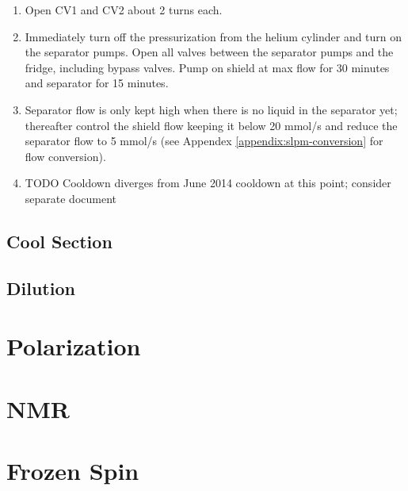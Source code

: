  \begin{enumerate}
 \item Open CV1 and CV2 about 2 turns each.
 \item Immediately turn off the pressurization from the helium cylinder and turn on the separator pumps.  Open all valves between the separator pumps and the fridge, including bypass valves.  Pump on shield at max flow for 30 minutes and separator for 15 minutes\cite{tapio-cooldown-procedure}.
 \item Separator flow is only kept high when there is no liquid in the separator yet; thereafter control the shield flow keeping it below 20 mmol/s and reduce the separator flow to 5 mmol/s (see Appendex \ref{appendix:slpm-conversion} for flow conversion). 
 \item TODO Cooldown diverges from June 2014 cooldown at this point; consider separate document
\end{enumerate}


\subsection{Cool \het{} Section}
\subsection{Dilution}

\section{Polarization}

\section{NMR}

\section{Frozen Spin}
\blindtext
